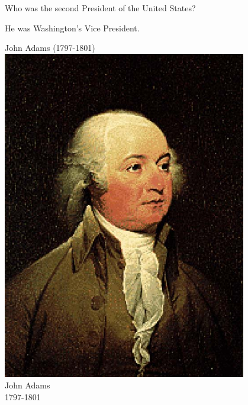 \documentclass{article}
\def\rescale{.4} %
\begin{document}
\useHints

\begin{card}
    Who was the second President of the United States?
    \begin{response}
        \begin{hint}
            He was Washington's Vice President.
        \end{hint}
        \begin{answer}
        \ifecListing
            John Adams (1797-1801)
        \else\centering
            \includegraphics[scale=\rescale]{presidents/ja2}\\
                John Adams\\
                1797-1801
        \fi
        \end{answer}
    \end{response}
\end{card}
\end{document}
